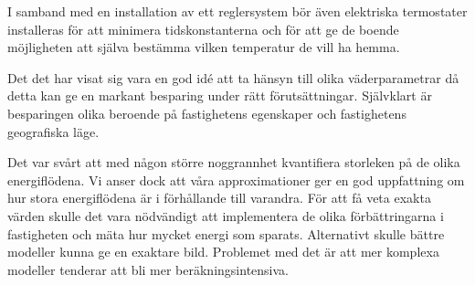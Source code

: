 I samband med en installation av ett reglersystem bör även elektriska termostater installeras för att minimera tidskonstanterna och för att ge de boende möjligheten att själva bestämma vilken temperatur de vill ha hemma.

Det det har visat sig vara en god idé att ta hänsyn till olika väderparametrar då
detta kan ge en markant besparing under rätt förutsättningar. Självklart är
besparingen olika beroende på fastighetens egenskaper och fastighetens geografiska läge.

Det var svårt att med någon större noggrannhet kvantifiera storleken på de olika energiflödena. Vi
anser dock att våra approximationer ger en god uppfattning om hur stora energiflödena är i förhållande
till varandra. För att få veta exakta värden skulle det vara nödvändigt att implementera de olika
förbättringarna i fastigheten och mäta hur mycket energi som sparats. Alternativt skulle
bättre modeller kunna ge en exaktare bild. Problemet med det är att mer komplexa modeller tenderar att
bli mer beräkningsintensiva.

